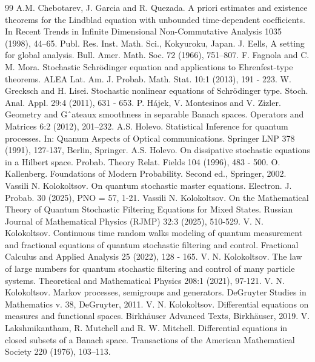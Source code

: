 \documentclass[10pt,a4paper]{amsart}
\begin{document}
\begin{thebibliography}{99}
 A.M. Chebotarev, J. Garcia and R. Quezada. A priori estimates and existence theorems for the Lindblad equation with unbounded time-dependent coefficients. In Recent Trends in Infinite Dimensional Non-Commutative Analysis 1035 (1998), 44–65. Publ. Res. Inst. Math. Sci., Kokyuroku, Japan.
 J. Eells, A setting for global analysis. Bull. Amer. Math. Soc. 72 (1966), 751–807.
 F. Fagnola and C. M. Mora. Stochastic Schr\"odinger equation and applications to Ehrenfest-type theorems. ALEA Lat. Am. J. Probab. Math. Stat. 10:1 (2013), 191 - 223.
 W. Grecksch and H. Lisei. Stochastic nonlinear equations of Schr\"odinger type. Stoch. Anal. Appl. 29:4 (2011), 631 - 653.
 P. H\'ajek, V. Montesinos and V. Zizler. Geometry and Gˆateaux smoothness in separable Banach spaces. Operators and Matrices 6:2 (2012), 201–232.
 A.S. Holevo. Statistical Inference for quantum processes. In: Quanum Aspects of Optical communications. Springer LNP 378 (1991), 127-137, Berlin, Springer.
 A.S. Holevo. On dissipative stochastic equations in a Hilbert space. Probab. Theory Relat. Fields 104 (1996), 483 - 500.
 O. Kallenberg. Foundations of Modern Probability. Second ed., Springer, 2002.
 Vassili N. Kolokoltsov. On quantum stochastic master equations. Electron. J. Probab. 30 (2025), PNO = 57, 1-21.
 Vassili N. Kolokoltsov. On the Mathematical Theory of Quantum Stochastic Filtering Equations for Mixed States. Russian Journal of Mathematical Physics (RJMP) 32:3 (2025), 510-529.
 V. N. Kolokoltsov. Continuous time random walks modeling of quantum measurement and fractional equations of quantum stochastic filtering and control. Fractional Calculus and Applied Analysis 25 (2022), 128 - 165.
 V. N. Kolokoltsov. The law of large numbers for quantum stochastic filtering and control of many particle systems. Theoretical and Mathematical Physics 208:1 (2021), 97-121.
 V. N. Kolokoltsov. Markov processes, semigroups and generators. DeGruyter Studies in Mathematics v. 38, DeGruyter, 2011.
 V. N. Kolokoltsov. Differential equations on measures and functional spaces. Birkh\"auser Advanced Texts, Birkh\"auser, 2019.
 V. Lakshmikantham, R. Mutchell and R. W. Mitchell. Differential equations in closed subsets of a Banach space. Transactions of the American Mathematical Society 220 (1976), 103--113.

\end{thebibliography}
\end{document}
